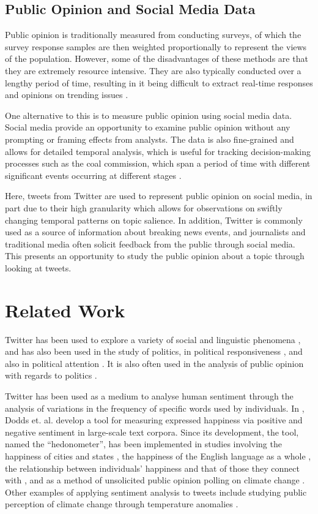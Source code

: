 \documentclass[12pt,onecolumn,twoside]{layout}
\begin{document}
\subsection*{Public Opinion and Social Media Data} %
Public opinion is traditionally measured from conducting surveys, of which the survey response samples are then weighted proportionally to represent the views of the population. However, some of the disadvantages of these methods are that they are extremely resource intensive. They are also typically conducted over a lengthy period of time, resulting in it being difficult to extract real-time responses and opinions on trending issues \cite{Klasnja2018}. 

One alternative to this is to measure public opinion using social media data. Social media provide an opportunity to examine public opinion without any prompting or framing effects from analysts. The data is also fine-grained and allows for detailed temporal analysis, which is useful for tracking decision-making processes such as the coal commission, which span a period of time with different significant events occurring at different stages \cite{Klasnja2018}. 

Here, tweets from Twitter are used to represent public opinion on social media, in part due to their high granularity which allows for observations on swiftly changing temporal patterns on topic salience. In addition, Twitter is commonly used as a source of information about breaking news events, and journalists and traditional media often solicit feedback from the public through social media. This presents an opportunity to study the public opinion about a topic through looking at tweets. 

\section*{Related Work} \label{sec:relatedwork}
Twitter has been used to explore a variety of social and linguistic phenomena \cite{Cao2012, Lin2013, Lin2014}, and has also been used in the study of politics, in political responsiveness \cite{Barbera2019}, and also in political attention \cite{Hemphill2014, Shapiro2017}. It is also often used in the analysis of public opinion with regards to politics \cite{DiGrazia2013, Vaccari2013, Barbera2016}.

Twitter has been used as a medium to analyse human sentiment through the analysis of variations in the frequency of specific words used by individuals. In \cite{Dodds2011}, Dodds et. al. develop a tool for measuring expressed happiness via positive and negative sentiment in large-scale text corpora. Since its development, the tool, named the ``hedonometer'', has been implemented in studies involving the happiness of cities and states \cite{Bliss2012}, the happiness of the English language as a whole \cite{Kloumann2012}, the relationship between individuals' happiness and that of those they connect with \cite{Mitchell2013}, and as a method of unsolicited public opinion polling on climate change \cite{Cody2015}. Other examples of applying sentiment analysis to tweets include studying public perception of climate change through temperature anomalies \cite{Moore2019}. 
\end{document}
